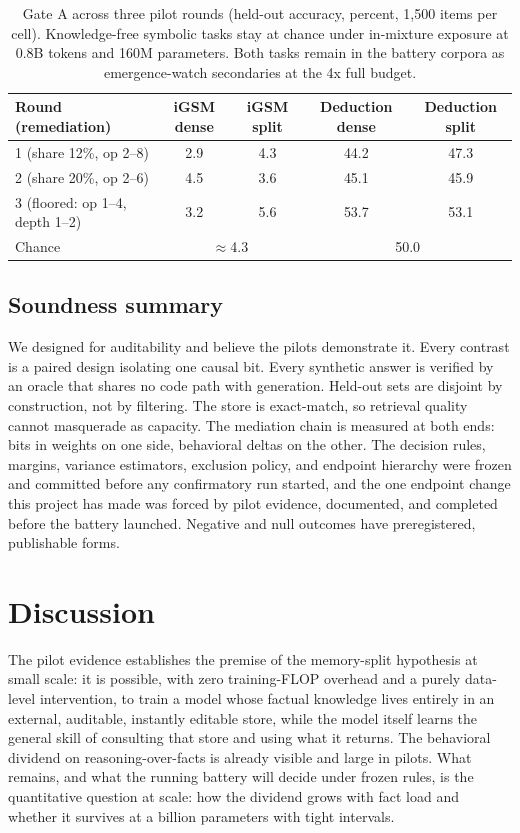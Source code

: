 \documentclass[11pt]{article}
\begin{document}
\begin{table}[t]
\centering
\small
\begin{tabular}{lcccc}
\toprule
Round (remediation) & iGSM dense & iGSM split & Deduction dense & Deduction split\\
\midrule
1 (share 12\%, op 2--8)            & 2.9 & 4.3 & 44.2 & 47.3\\
2 (share 20\%, op 2--6)            & 4.5 & 3.6 & 45.1 & 45.9\\
3 (floored: op 1--4, depth 1--2)   & 3.2 & 5.6 & 53.7 & 53.1\\
\midrule
Chance                              & \multicolumn{2}{c}{$\approx$4.3} & \multicolumn{2}{c}{50.0}\\
\bottomrule
\end{tabular}
\caption{Gate A across three pilot rounds (held-out accuracy, percent,
1{,}500 items per cell). Knowledge-free symbolic tasks stay at chance
under in-mixture exposure at 0.8B tokens and 160M parameters. Both tasks
remain in the battery corpora as emergence-watch secondaries at the 4x
full budget.}
\label{tab:gatea}
\end{table}

\subsection{Soundness summary}

We designed for auditability and believe the pilots demonstrate it.
Every contrast is a paired design isolating one causal bit. Every
synthetic answer is verified by an oracle that shares no code path with
generation. Held-out sets are disjoint by construction, not by filtering.
The store is exact-match, so retrieval quality cannot masquerade as
capacity. The mediation chain is measured at both ends: bits in weights
on one side, behavioral deltas on the other. The decision rules, margins,
variance estimators, exclusion policy, and endpoint hierarchy were frozen
and committed before any confirmatory run started, and the one endpoint
change this project has made was forced by pilot evidence, documented,
and completed before the battery launched. Negative and null outcomes
have preregistered, publishable forms.

\section{Discussion}

The pilot evidence establishes the premise of the memory-split hypothesis
at small scale: it is possible, with zero training-FLOP overhead and a
purely data-level intervention, to train a model whose factual knowledge
lives entirely in an external, auditable, instantly editable store, while
the model itself learns the general skill of consulting that store and
using what it returns. The behavioral dividend on reasoning-over-facts is
already visible and large in pilots. What remains, and what the running
battery will decide under frozen rules, is the quantitative question at
scale: how the dividend grows with fact load and whether it survives at a
billion parameters with tight intervals.
\end{document}
